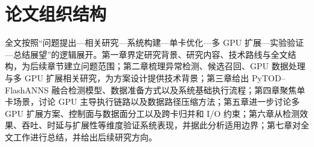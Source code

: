 \section{论文组织结构}

全文按照``问题提出---相关研究---系统构建---单卡优化---多 GPU 扩展---实验验证---总结展望''的逻辑展开。第一章界定研究背景、研究内容、技术路线与全文结构，为后续章节建立问题范围；第二章梳理异常检测、候选召回、GPU 数据处理与多 GPU 扩展相关研究，为方案设计提供技术背景；第三章给出 PyTOD--FlashANNS 融合检测模型、数据准备方式以及系统基础执行流程；第四章聚焦单卡场景，讨论 GPU 主导执行链路以及数据路径压缩方法；第五章进一步讨论多 GPU 扩展方案、控制面与数据面分工以及跨卡归并和 I/O 约束；第六章从检测效果、吞吐、时延与扩展性等维度验证系统表现，并据此分析适用边界；第七章对全文工作进行总结，并给出后续研究方向。
